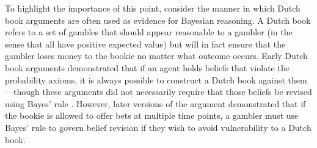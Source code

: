 To highlight the importance of this point, consider the manner in which Dutch book arguments are often used as evidence for Bayesian reasoning. A Dutch book refers to a set of gambles that should appear reasonable to a gambler (in the sense that all have positive expected value) but will in fact ensure that the gambler loses money to the bookie no matter what outcome occurs. Early Dutch book arguments demonstrated that if an agent holds beliefs that violate the probability axioms, it is always possible to construct a Dutch book against them---though these arguments did not necessarily require that those beliefs be revised using Bayes' rule \cite{de_finetti_foresight:_1980}. However, later versions of the argument \cite{teller_conditionalization_1973} demonstrated that if the bookie is allowed to offer bets at multiple time points, a gambler must use Bayes' rule to govern belief revision if they wish to avoid vulnerability to a Dutch book. 

